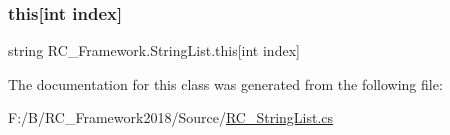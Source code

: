 \mbox{\label{class_r_c___framework_1_1_string_list_ad048db5241753c4e743f018fb5ae7d78}} 
\subsubsection{\texorpdfstring{this[int index]}{this[int index]}}
{\footnotesize\ttfamily string R\+C\+\_\+\+Framework.\+String\+List.\+this\mbox{[}int index\mbox{]}\hspace{0.3cm}{\ttfamily [get]}}



The documentation for this class was generated from the following file\+:\begin{DoxyCompactItemize}
\item 
F\+:/\+B/\+R\+C\+\_\+\+Framework2018/\+Source/\mbox{\hyperlink{_r_c___string_list_8cs}{R\+C\+\_\+\+String\+List.\+cs}}\end{DoxyCompactItemize}
